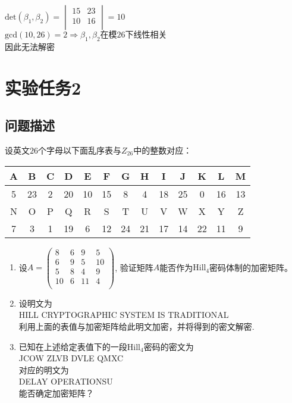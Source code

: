 \documentclass[12pt]{article}
\begin{document}
$\textrm{det}(\beta_1,\beta_2)=
\begin{vmatrix}
15 & 23\\
10 & 16\\
\end{vmatrix}=10
$\\
$\textrm{gcd}(10,26)=2 \Rightarrow \beta_1,\beta_2\text{在模26下线性相关}$\\
因此无法解密\\
\newpage
\section*{实验任务2}
\subsection*{问题描述}
设英文$26$个字母以下面乱序表与$Z_{26}$中的整数对应：

\begin{tabular}{|c|c|c|c|c|c|c|c|c|c|c|c|c|}
\hline 
A & B & C & D & E & F & G & H & I & J & K & L & M \\ 
\hline 
5 & 23 & 2 & 20 & 10 & 15 & 8 & 4 & 18 & 25 & 0 & 16 & 13 \\ 
\hline 
N & O & P & Q & R & S & T & U & V & W & X & Y & Z \\ 
\hline 
7 & 3 & 1 & 19 & 6 & 12 & 24 & 21 & 17 & 14 & 22 & 11 & 9 \\ 
\hline 
\end{tabular} 

\begin{enumerate}
\item
设$A=
\begin{pmatrix}
8 & 6 & 9 & 5\\
6 & 9 & 5 & 10\\
5 & 8 & 4 & 9\\
10 & 6 & 11 & 4\\
\end{pmatrix}
$, 验证矩阵$A$能否作为$\text{Hill}_4$密码体制的加密矩阵。
\item
设明文为\\
HILL CRYPTOGRAPHIC SYSTEM IS TRADITIONAL\\
利用上面的表值与加密矩阵给此明文加密，并将得到的密文解密.
\item
已知在上述给定表值下的一段$\text{Hill}_4$密码的密文为\\
JCOW ZLVB DVLE QMXC\\
对应的明文为\\
DELAY OPERATIONSU\\
能否确定加密矩阵？
\end{enumerate}
\end{document}
